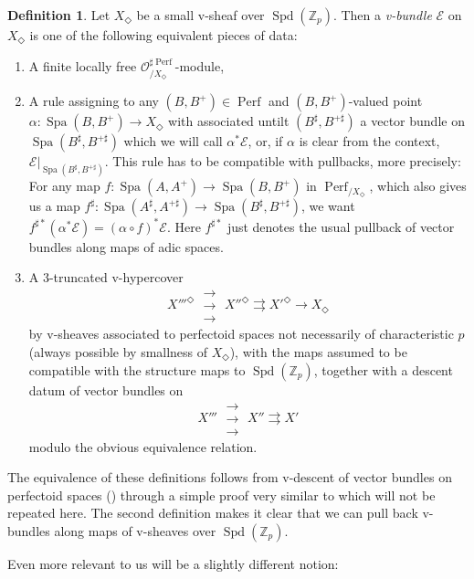 \documentclass[10pt,twoside]{article}
\numberwithin{equation}{section}
\theoremstyle{plain}
\theoremstyle{definition}
\newtheorem{mydef}[mythm]{Definition}
\DeclareMathOperator{\Spa}{Spa}
\DeclareMathOperator{\Spd}{Spd}
\DeclareMathOperator{\Perf}{Perf}
\newcommand{\ZZ}{\mathbb{Z}}
\newcommand{\MCE}{\mathcal{E}}
\newcommand{\MCO}{\mathcal{O}}
\let \diamond \Diamond
\newcommand{\rrrarrows}{\;\substack{\rightarrow\\[-1em] \rightarrow \\[-1em] \rightarrow}\;}
\begin{document}
\begin{mydef}\label{defVBundle}
Let \(X_{\diamond}\) be a small v-sheaf over \(\Spd(\ZZ_p)\). Then a \emph{v-bundle} \(\MCE\) on \(X_\diamond\) is one of the following equivalent pieces of data:
\begin{enumerate}
    \item A finite locally free \(\MCO^{\sharp\Perf}_{/X_\diamond}\)-module,
    \item A rule assigning to any \((B,B^+)\in \Perf\) and \((B,B^+)\)-valued point \(\alpha \colon\Spa(B,B^+)\to X_{\diamond}\) with associated untilt \((B^{\sharp},B^{+\sharp})\) a vector bundle on \(\Spa(B^{\sharp},B^{+{\sharp}})\) which we will call \(\alpha^*\MCE\), or, if \(\alpha\) is clear from the context, \(\MCE|_{\Spa(B^{\sharp},B^{+{\sharp}})}\). This rule has to be compatible with pullbacks, more precisely: For any map \(f\colon\Spa(A,A^+)\to \Spa(B,B^+)\) in \(\Perf_{/X_\diamond}\), which also gives us a map \(f^{\sharp}\colon \Spa(A^{\sharp},A^{+\sharp})\to \Spa(B^{\sharp},B^{+\sharp})\), we want \(f^{\sharp*}(\alpha^*\MCE)=(\alpha\circ f)^* \MCE\). Here \(f^{\sharp*}\) just denotes the usual pullback of vector bundles along maps of adic spaces.
    \item A 3-truncated v-hypercover
    \[X'''^\diamond\;\substack{\rightarrow\\[-1em] \rightarrow \\[-1em] \rightarrow}\; X''^\diamond\rightrightarrows X'^\diamond\longrightarrow X_{\diamond}\]
    by v-sheaves associated to perfectoid spaces not necessarily of characteristic \(p\) (always possible by smallness of \(X_{\diamond}\)), with the maps assumed to be compatible with the structure maps to \(\Spd(\ZZ_p)\),
     together with a descent datum of vector bundles on 
    \[X''' \rrrarrows X''\rightrightarrows X'\]
    modulo the obvious equivalence relation.
\end{enumerate}
\end{mydef}

The equivalence of these definitions follows from v-descent of vector bundles on perfectoid spaces (\cite[Lemma 17.1.8]{SW20}) through a simple proof very similar to  which will not be repeated here. The second definition makes it clear that we can pull back v-bundles along maps of v-sheaves over \(\Spd(\ZZ_p)\).\par

Even more relevant to us will be a slightly different notion:
\end{document}
